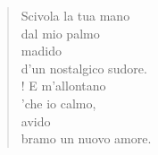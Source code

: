
\begin{verse}
    Scivola la tua mano\\
    dal mio palmo\\
    madido\\
    d'un nostalgico sudore.\\!
    E m'allontano\\
    'che io calmo,\\
    avido\\
    bramo un nuovo amore.
    
\end{verse}